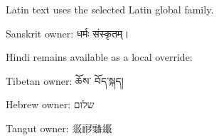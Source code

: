 \documentclass[12pt]{article}
\begin{document}
Latin text uses the selected Latin global family.

Sanskrit owner: धर्मः संस्कृतम्।

Hindi remains available as a local override:

Tibetan owner: ཆོས་ བོད་སྐད།

Hebrew owner: שלום

Tangut owner: 𗼇𗟲𘚜𗧻
\end{document}
